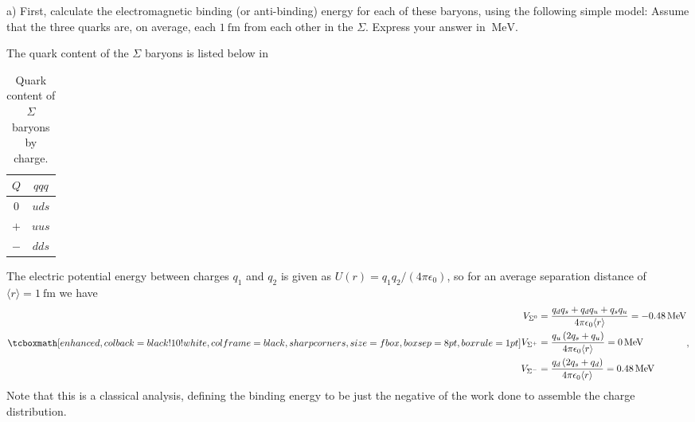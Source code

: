 \def\duedate{09/30/22}
\def\HWnum{2}



    

a) First, calculate the electromagnetic binding (or anti-binding) energy for each of these baryons, using the following simple model: Assume that the three quarks are, on average, each $\SI{1}{\femto\m}$ from each other in the $\Sigma$.
Express your answer in $\SI{}{\MeV}$.

The quark content of the $\Sigma$ baryons is listed below in 

\begin{table}[h!]
\begin{center}
\begin{tabular}{c|c}
    $Q$ & $qqq$ \\
    \hline
    $0$ & $uds$ \\
    $+$ & $uus$ \\
    $-$ & $dds$
\end{tabular}
\end{center}
\caption{Quark content of $\Sigma$ baryons by charge.}
\label{tab:sig-quarks}
\end{table}

The electric potential energy between charges $q_1$ and $q_2$ is given as $U(r) = q_1 q_2 / (4\pi\epsilon_0)$, so for an average separation distance of $\langle r \rangle = \SI{1}{\femto\m}$ we have
\begin{eqnarray}
    \label{eq:potential-energies}
    \eqbox{
    \begin{aligned}
    V_{\Sigma^{0}} &= \frac{q_{d} q_{s} + q_{d} q_{u} + q_{s} q_{u}}{4 \pi \epsilon_{0} \langle r \rangle} = \SI{-0.48}{\MeV} \\
    V_{\Sigma^{+}} &= \frac{q_{u} \left(2 q_{s} + q_{u}\right)}{4 \pi \epsilon_{0} \langle r \rangle} = \SI{0}{\MeV} \\
    V_{\Sigma^{-}} &= \frac{q_{d} \left(2 q_{s} + q_{d}\right)}{4 \pi \epsilon_{0} \langle r \rangle} = \SI{0.48}{\MeV} 
\end{aligned}
}
,\end{eqnarray}
Note that this is a classical analysis, defining the binding energy to be just the negative of the work done to assemble the charge distribution.


